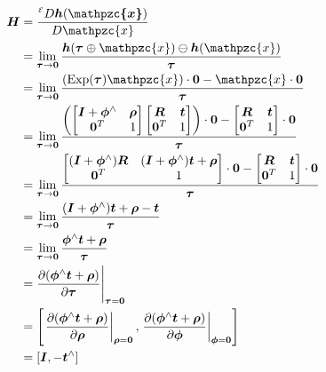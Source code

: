 \documentclass[12pt, a4paper]{article}
\DeclareMathOperator{\Exp}{Exp}
\begin{document}
\begin{align*}
  \bm{H} & =
  \frac{\prescript{\scriptscriptstyle\mathcal{E}}{}{D}\bm{h}(\bm{\mathpzc{x}})}
  {D \mathpzc{x}}\\
  & = \lim_{\bm{\tau}\rightarrow \bm{0}} \frac{\bm{h}(\bm{\tau}\oplus\mathpzc{x})
  \ominus \bm{h}(\mathpzc{x})}{\bm{\tau}}\\
  & = \lim_{\bm{\tau}\rightarrow \bm{0}} \frac{(\Exp(\bm{\tau})\mathpzc{x})\cdot
  \bm{0}-\mathpzc{x}\cdot \bm{0}}{\bm{\tau}}\\
  & = \lim_{\bm{\tau}\rightarrow \bm{0}}\frac{\left(\begin{bmatrix}
        \bm{I}+\bm{\phi}^{\wedge} & \bm{\rho}\\
        \bm{0}^{T} & 1
  \end{bmatrix}\begin{bmatrix}
    \bm{R} & \bm{t}\\
    \bm{0}^{T} & 1
  \end{bmatrix}\right) \cdot \bm{0}-\begin{bmatrix}
    \bm{R} & \bm{t}\\
    \bm{0}^{T} & 1
  \end{bmatrix}\cdot \bm{0}}{\bm{\tau}}\\
  & = \lim_{\bm{\tau}\rightarrow \bm{0}}\frac{\begin{bmatrix}
      (\bm{I}+\bm{\phi}^{\wedge})\bm{R} &
      (\bm{I}+\bm{\phi}^{\wedge})\bm{t}+\bm{\rho}\\
      \bm{0}^{T} & 1
    \end{bmatrix}\cdot \bm{0}-\begin{bmatrix}
      \bm{R} & \bm{t}\\
      \bm{0}^{T} & 1
  \end{bmatrix}\cdot \bm{0}}{\bm{\tau}}\\
  & = \lim_{\bm{\tau}\rightarrow
  \bm{0}}\frac{(\bm{I}+\bm{\phi}^{\wedge})\bm{t}+\bm{\rho}-\bm{t}}{\bm{\tau}}\\
  & = \lim_{\bm{\tau}\rightarrow
  \bm{0}}\frac{\bm{\phi}^{\wedge}\bm{t}+\bm{\rho}}{\bm{\tau}}\\
  & = \frac{\partial(\bm{\phi}^{\wedge}\bm{t}+\bm{\rho})}{\partial
  \bm{\tau}}\Bigg|_{\bm{\tau}=\bm{0}}\\
  & = \left[\left.\frac{\partial(\bm{\phi}^{\wedge}\bm{t}+\bm{\rho})}
      {\partial\bm{\rho}}\right|_{\bm{\rho}=\bm{0}},
      \left.\frac{\partial(\bm{\phi}^{\wedge}\bm{t}+\bm{\rho})}
      {\partial\bm{\phi}}\right|_{\bm{\phi}=\bm{0}}\right]\\
  & = [\bm{I}, -\bm{t}^{\wedge}]
\end{align*}
\end{document}
